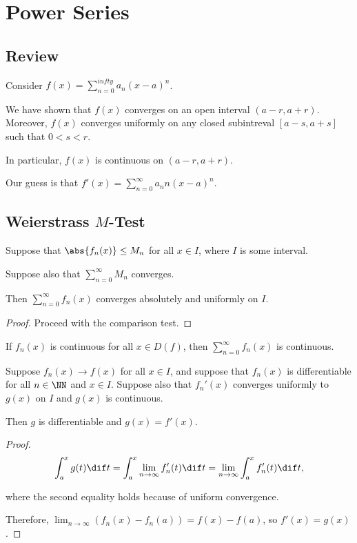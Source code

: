 \documentclass[11pt]{scrartcl}
\begin{document}
\section{Power Series}

\subsection{Review}

Consider $f(x) = \sum_{n=0}^{infty}a_n(x-a)^n$.

We have shown that $f(x)$ converges on an open interval $(a-r, a+r)$. Moreover, $f(x)$ converges uniformly on any closed subintreval $[a-s, a+s]$ such that $0 < s < r$.

In particular, $f(x)$ is continuous on $(a-r, a+r)$.

Our guess is that $f'(x) = \sum_{n=0}^{\infty}a_nn(x-a)^n$.

\subsection{Weierstrass $M$-Test}

\begin{theorem}
Suppose that $\abs{f_n(x)} \leq M_n$ for all $x\in I$, where $I$ is some interval.

Suppose also that $\sum_{n=0}^{\infty}M_n$ converges.

Then $\sum_{n=0}^{\infty}f_n(x)$ converges absolutely and uniformly on $I$.
\end{theorem}

\begin{proof}
  \hfill

Proceed with the comparison test.
\end{proof}
\begin{lemma}
If $f_n(x)$ is continuous for all $x\in D(f)$, then
$\sum_{n=0}^{\infty}f_n(x)$ is continuous.
\end{lemma}
\begin{theorem}
  Suppose $f_n(x) \to f(x)$ for all $x\in I$, and suppose that
  $f_n(x)$ is differentiable for all $n\in\NN$ and $x\in I$. Suppose
  also that $f_n'(x)$ converges uniformly to $g(x)$ on $I$ and $g(x)$ is continuous.

  Then $g$ is differentiable and $g(x) = f'(x)$.
\end{theorem}

\begin{proof}
  \hfill

  \[\int_a^xg(t)\dif t = \int_a^x\lim_{n\to\infty}f_n'(t)\dif t = \lim_{n\to\infty}\int_a^xf_n'(t)\dif t,\] 

  where the second equality holds because of uniform convergence.

  Therefore, $\lim_{n\to\infty}(f_n(x) - f_n(a)) = f(x)-f(a)$, so
  $f'(x) = g(x)$.
\end{proof}
\end{document}
